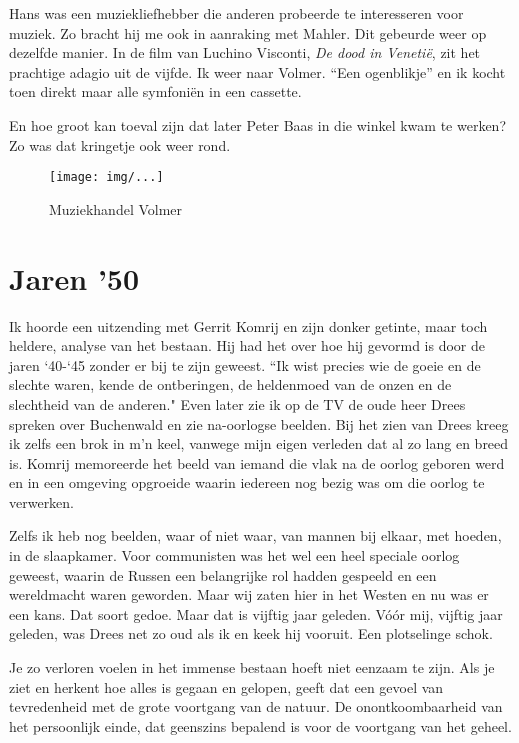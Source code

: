 \documentclass[10pt,twoside,openright]{memoir}
\begin{document}
Hans was een muziekliefhebber die anderen probeerde te interesseren voor muziek. Zo bracht hij me ook in aanraking met Mahler. Dit gebeurde weer op dezelfde manier. In de film van Luchino Visconti, \emph{De dood in Venetië}, zit het prachtige adagio uit de vijfde. Ik weer naar Volmer. ``Een ogenblikje'' en ik kocht toen direkt maar alle symfoniën in een cassette.

En hoe groot kan toeval zijn dat later Peter Baas in die winkel kwam te werken? Zo was dat kringetje ook weer rond. 

\begin{figure}[t]
\texttt{[image: img/...]}
\caption{Muziekhandel Volmer}
\end{figure}

\chapter{Jaren '50} %
\label{cha:jaren50}

Ik hoorde een uitzending met Gerrit Komrij en zijn donker getinte, maar toch heldere, analyse van het bestaan. Hij had het over hoe hij gevormd is door de jaren `40-`45 zonder er bij te zijn geweest. ``Ik wist precies wie de goeie en de slechte waren, kende de ontberingen, de heldenmoed van de onzen en de slechtheid van de anderen." Even later zie ik op de TV de oude heer Drees spreken over Buchenwald en zie na-oorlogse beelden. Bij het zien van Drees kreeg ik zelfs een brok in m’n keel, vanwege mijn eigen verleden dat al zo lang en breed is. Komrij memoreerde het beeld van iemand die vlak na de oorlog geboren werd en in een omgeving opgroeide waarin iedereen nog bezig was om die oorlog te verwerken. 

Zelfs ik heb nog beelden, waar of niet waar, van mannen bij elkaar, met hoeden, in de slaapkamer. Voor communisten was het wel een heel speciale oorlog geweest, waarin de Russen een belangrijke rol hadden gespeeld en een wereldmacht waren geworden. Maar wij zaten hier in het Westen en nu was er een kans. Dat soort gedoe. Maar dat is vijftig jaar geleden. Vóór mij, vijftig jaar geleden, was Drees net zo oud als ik en keek hij vooruit. Een plotselinge schok.

Je zo verloren voelen in het immense bestaan hoeft niet eenzaam te zijn. Als je ziet en herkent hoe alles is gegaan en gelopen, geeft dat een gevoel van tevredenheid met de grote voortgang van de natuur. De onontkoombaarheid van het persoonlijk einde, dat geenszins bepalend is voor de voortgang van het geheel.
\end{document}
